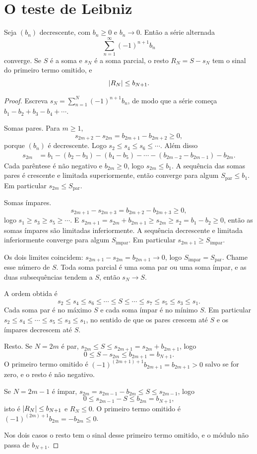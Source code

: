 \documentclass[11pt,a4paper]{article}
\begin{document}
\section{O teste de Leibniz}

\begin{teorema}[Leibniz]
Seja \((b_n)\) decrescente, com \(b_n\ge 0\) e \(b_n\to 0\). Então a série alternada
\[
\sum_{n=1}^\infty (-1)^{n+1} b_n
\]
converge. Se \(S\) é a soma e \(s_N\) é a soma parcial, o resto \(R_N=S-s_N\) tem o sinal do primeiro termo omitido, e
\[
\left\lvert R_N \right\rvert\le b_{N+1}.
\]
\end{teorema}

\begin{proof}
Escreva \(s_N=\sum_{n=1}^N (-1)^{n+1} b_n\), de modo que a série começa \(b_1-b_2+b_3-b_4+\cdots\).

Somas pares. Para \(m\ge 1\),
\[
s_{2m+2}-s_{2m}=b_{2m+1}-b_{2m+2}\ge 0,
\]
porque \((b_n)\) é decrescente. Logo \(s_2\le s_4\le s_6\le\cdots\). Além disso
\begin{align*}
s_{2m}
&=b_1-(b_2-b_3)-(b_4-b_5)-\cdots-(b_{2m-2}-b_{2m-1})-b_{2m}.
\end{align*}
Cada parêntese é não negativo e \(b_{2m}\ge 0\), logo \(s_{2m}\le b_1\). A sequência das somas pares é crescente e limitada superiormente, então converge para algum \(S_{\mathrm{par}}\le b_1\). Em particular \(s_{2m}\le S_{\mathrm{par}}\).

Somas ímpares. 
\[
s_{2m+1}-s_{2m+3}=b_{2m+2}-b_{2m+3}\ge 0,
\]
logo \(s_1\ge s_3\ge s_5\ge\cdots\). E \(s_{2m+1}=s_{2m}+b_{2m+1}\ge s_{2m}\ge s_2=b_1-b_2\ge 0\), então as somas ímpares são limitadas inferiormente. A sequência decrescente e limitada inferiormente converge para algum \(S_{\mathrm{impar}}\). Em particular \(s_{2m+1}\ge S_{\mathrm{impar}}\).

Os dois limites coincidem: \(s_{2m+1}-s_{2m}=b_{2m+1}\to 0\), logo \(S_{\mathrm{impar}}=S_{\mathrm{par}}\). Chame esse número de \(S\). Toda soma parcial é uma soma par ou uma soma ímpar, e as duas subsequências tendem a \(S\), então \(s_N\to S\).

A ordem obtida é
\[
s_2\le s_4\le s_6\le\cdots\le S\le\cdots\le s_7\le s_5\le s_3\le s_1.
\]
Cada soma par é no máximo \(S\) e cada soma ímpar é no mínimo \(S\). Em particular \(s_2\le s_4\le\cdots\le s_5\le s_3\le s_1\), no sentido de que os pares crescem até \(S\) e os ímpares decrescem até \(S\).

Resto. Se \(N=2m\) é par, \(s_{2m}\le S\le s_{2m+1}=s_{2m}+b_{2m+1}\), logo
\[
0\le S-s_{2m}\le b_{2m+1}=b_{N+1}.
\]
O primeiro termo omitido é \((-1)^{(2m+1)+1}b_{2m+1}=b_{2m+1}>0\) salvo se for zero, e o resto é não negativo.

Se \(N=2m-1\) é ímpar, \(s_{2m}=s_{2m-1}-b_{2m}\le S\le s_{2m-1}\), logo
\[
0\le s_{2m-1}-S\le b_{2m}=b_{N+1},
\]
isto é \(\left\lvert R_N \right\rvert\le b_{N+1}\) e \(R_N\le 0\). O primeiro termo omitido é \((-1)^{(2m)+1}b_{2m}=-b_{2m}\le 0\).

Nos dois casos o resto tem o sinal desse primeiro termo omitido, e o módulo não passa de \(b_{N+1}\).
\end{proof}
\end{document}
